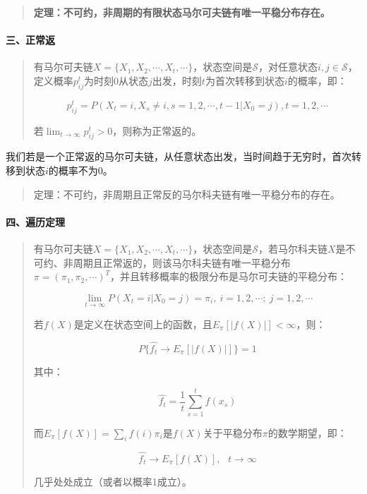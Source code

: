 \begin{quote}
\textbf{定理：不可约，非周期的有限状态马尔可夫链有唯一平稳分布存在。}
\end{quote}

\hypertarget{ux4e09ux6b63ux5e38ux8fd4}{%
\paragraph{三、正常返}\label{ux4e09ux6b63ux5e38ux8fd4}}

\begin{quote}
有马尔可夫链\(X=\{X_1,X_2,\cdots,X_t,\cdots\}\)，状态空间是\(\mathcal{S}\)，对任意状态\(i,j\in \mathcal{S}\)，定义概率\(p_{ij}^t\)为时刻0从状态\(j\)出发，时刻\(t\)为首次转移到状态\(i\)的概率，即：

\[p_{ij}^t=P(X_t=i,X_s\neq i,s=1,2,\cdots,t-1|X_0=j),t=1,2,\cdots\]

若\(\lim_{t\rightarrow\infty} p_{ij}^t>0\)，则称为正常返的。
\end{quote}

我们若是一个正常返的马尔可夫链，从任意状态出发，当时间趋于无穷时，首次转移到状态\(i\)的概率不为0。

\begin{quote}
定理：不可约，非周期且正常反的马尔科夫链有唯一平稳分布的存在。
\end{quote}

\hypertarget{ux56dbux904dux5386ux5b9aux7406}{%
\paragraph{四、遍历定理}\label{ux56dbux904dux5386ux5b9aux7406}}

\begin{quote}
有马尔可夫链\(X=\{X_1,X_2,\cdots,X_t,\cdots\}\)，状态空间是\(\mathcal{S}\)，若马尔科夫链\(X\)是不可约、非周期且正常返的，则该马尔科夫链有唯一平稳分布\(\pi=(\pi_1,\pi_2,\cdots)^T\)，并且转移概率的极限分布是马尔可夫链的平稳分布：

\[\lim_{t\rightarrow \infty}P(X_t=i|X_0=j)=\pi_i,\ i=1,2,\cdots;\ j=1,2,\cdots\]

若\(f(X)\)是定义在状态空间上的函数，且\(E_{\pi}[|f(X)|]<\infty\)，则：

\[P\{ \hat{f_t}\rightarrow E_{\pi}[|f(X)|]\}=1\]

其中：

\[\hat{f_t}=\frac{1}{t}\sum_{s=1}^{t}f(x_s)\]

而\(E_{\pi}[f(X)]=\sum_if(i)\pi_i\)是\(f(X)\)关于平稳分布\(\pi\)的数学期望，即：

\[\hat{f_t} \rightarrow E_{\pi}[f(X)] ,\ \ \ t \rightarrow\infty\]

几乎处处成立（或者以概率1成立）。
\end{quote}

